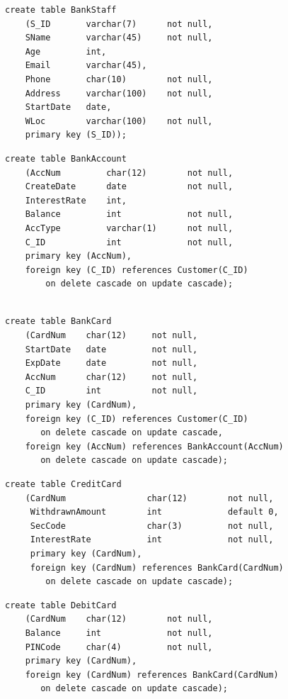 \documentclass[12pt,a4paper]{article}
\begin{document}
\begin{verbatim}
create table BankStaff
    (S_ID       varchar(7)      not null,
    SName       varchar(45)     not null,
    Age         int,
    Email       varchar(45),
    Phone       char(10)        not null,
    Address     varchar(100)    not null,
    StartDate   date,
    WLoc        varchar(100)    not null,
	primary key (S_ID));
\end{verbatim}

\begin{verbatim}
create table BankAccount
    (AccNum         char(12)        not null,
    CreateDate      date            not null,
    InterestRate    int,
    Balance         int             not null,
    AccType         varchar(1)      not null,
    C_ID            int             not null,
	primary key (AccNum),
    foreign key (C_ID) references Customer(C_ID)
		on delete cascade on update cascade);
\end{verbatim}

\begin{verbatim}

create table BankCard
    (CardNum    char(12)     not null,
    StartDate   date         not null,
    ExpDate     date         not null,
    AccNum      char(12)     not null,
    C_ID        int          not null,
    primary key (CardNum),
    foreign key (C_ID) references Customer(C_ID) 
       on delete cascade on update cascade,
    foreign key (AccNum) references BankAccount(AccNum) 
       on delete cascade on update cascade);

\end{verbatim}



\begin{verbatim}
create table CreditCard
    (CardNum                char(12)        not null,
     WithdrawnAmount        int             default 0,
     SecCode                char(3)         not null,
     InterestRate           int             not null,
     primary key (CardNum),
     foreign key (CardNum) references BankCard(CardNum) 
        on delete cascade on update cascade);

\end{verbatim}


\begin{verbatim}
create table DebitCard
    (CardNum    char(12)        not null,
    Balance     int             not null,
    PINCode     char(4)         not null,
    primary key (CardNum),
    foreign key (CardNum) references BankCard(CardNum) 
       on delete cascade on update cascade);
\end{verbatim}
\end{document}
